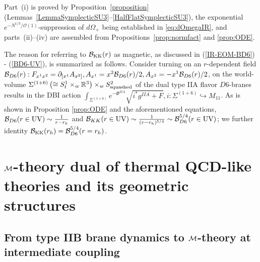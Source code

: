 \documentclass[a4paper,11pt,fleqn]{article}
\theoremstyle{plain}
\theoremstyle{definition}
\begin{document}
\noindent Part~\textup{(i)} is proved by Proposition~\ref{proposition}
(Lemmas~\ref{LemmaSymplecticSU3}--\ref{HalfFlatSymplecticSU3}), the exponential
$e^{-N^{1/3}/\mathcal{O}(1)}$-suppression of $d\Omega_+$ being established in
\eqref{eq:dOmegaIR}, and parts~\textup{(ii)}--\textup{(iv)} are assembled from
Propositions~\ref{prop:normfact} and  \ref{prop:ODE}.

\noindent * The reason for referring to ${\cal B}_{\rm KK}(r)$ as magnetic, as discussed in (\ref{IR-EOM-BD6}) - (\ref{BD6-UV}), is summarized as follows. Consider turning on an $r$-dependent field ${\cal B}_{D6}(r): F_{x^1x^2} = \partial_{[x^1}A_{x^2]}, A_{x^1} = x^2 {\cal B}_{D6}(r)/2, A_{x^2} = - x^1{\cal B}_{D6}(r)/2$, on the world-volume $\Sigma^{(1+6)}\left(\cong S^1_t\times_w\mathbb{R}^3\right)\times_w S^2_{\rm squashed}$ of the dual type IIA flavor $D6$-branes results in the DBI action $\int_{\Sigma^{(1+6)}}e^{-\Phi^{IIA}}\sqrt{i^*g^{IIA} + F}, i:\Sigma^{(1+6)}\hookrightarrow M_{11}$. As is shown in Proposition \ref{prop:ODE} and the aforementioned equations,  ${\cal B}_{D6}(r\in{\rm UV})\sim\frac{1}{r - r_h}$ and  ${\cal B}_{KK}(r\in{\rm UV})\sim\frac{1}{(r - r_h)^{5/4}}\sim{\cal B}_{D6}^{5/4}(r\in{\rm UV})$; we further identity  ${\cal B}_{\rm KK}(r_h) = {\cal B}_{D6}^{5/4}(r=r_h)$.


\section{${\cal M}$-theory dual of thermal QCD-like theories and its geometric structures}

\subsection{From type IIB brane dynamics to ${\cal M}$-theory at intermediate coupling}
\end{document}
